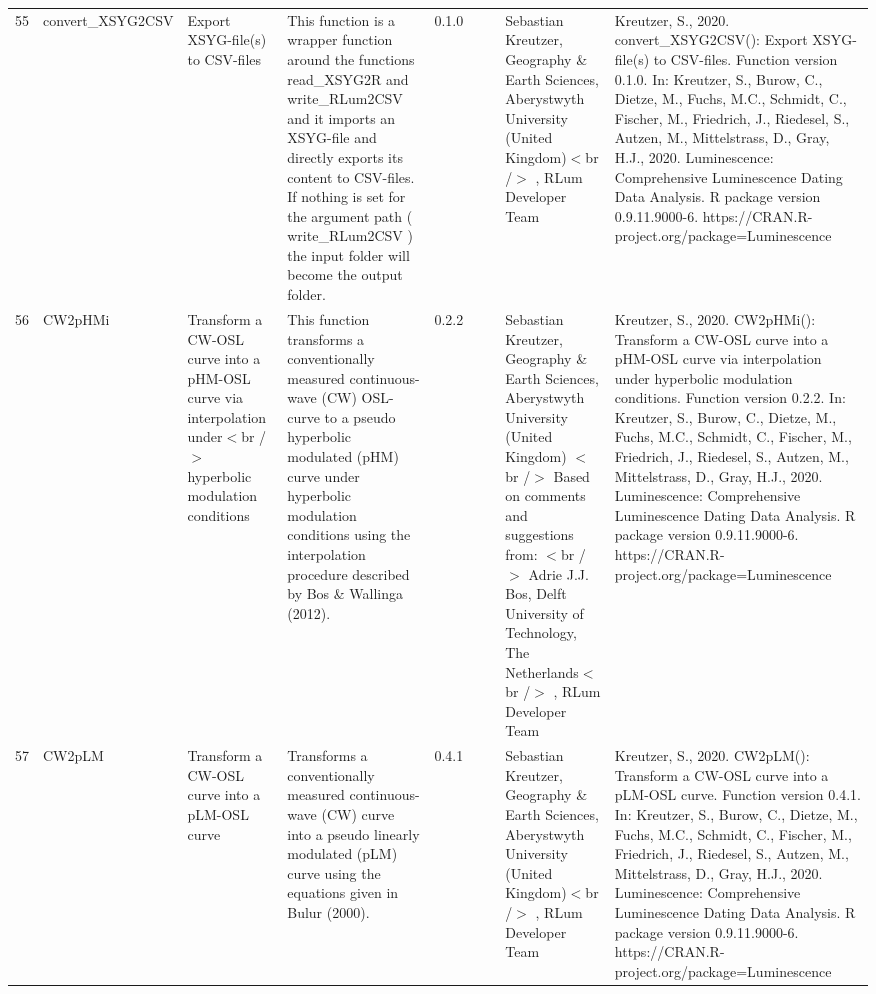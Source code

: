 \begin{table}[ht]
\begin{tabular}{rllllllll}
 \\ 
  55 & convert\_XSYG2CSV & Export XSYG-file(s) to CSV-files & This function is a wrapper function around the functions  read\_XSYG2R  and write\_RLum2CSV  and it imports an XSYG-file and directly exports its content to CSV-files. If nothing is set for the argument  path  ( write\_RLum2CSV ) the input folder will become the output folder. & 0.1.0
 &  &  & Sebastian Kreutzer, Geography \& Earth Sciences, Aberystwyth University (United Kingdom)$<$br /$>$ , RLum Developer Team & Kreutzer, S., 2020. convert\_XSYG2CSV(): Export XSYG-file(s) to CSV-files. Function version 0.1.0. In: Kreutzer, S., Burow, C., Dietze, M., Fuchs, M.C., Schmidt, C., Fischer, M., Friedrich, J., Riedesel, S., Autzen, M., Mittelstrass, D., Gray, H.J., 2020. Luminescence: Comprehensive Luminescence Dating Data Analysis. R package version 0.9.11.9000-6. https://CRAN.R-project.org/package=Luminescence
 \\ 
  56 & CW2pHMi & Transform a CW-OSL curve into a pHM-OSL curve via interpolation under$<$br /$>$ hyperbolic modulation conditions & This function transforms a conventionally measured continuous-wave (CW) OSL-curve to a pseudo hyperbolic modulated (pHM) curve under hyperbolic modulation conditions using the interpolation procedure described by Bos \& Wallinga (2012). & 0.2.2
 &  &  & Sebastian Kreutzer, Geography \& Earth Sciences, Aberystwyth University (United Kingdom) $<$br /$>$ Based on comments and suggestions from: $<$br /$>$ Adrie J.J. Bos, Delft University of Technology, The Netherlands$<$br /$>$ , RLum Developer Team & Kreutzer, S., 2020. CW2pHMi(): Transform a CW-OSL curve into a pHM-OSL curve via interpolation under hyperbolic modulation conditions. Function version 0.2.2. In: Kreutzer, S., Burow, C., Dietze, M., Fuchs, M.C., Schmidt, C., Fischer, M., Friedrich, J., Riedesel, S., Autzen, M., Mittelstrass, D., Gray, H.J., 2020. Luminescence: Comprehensive Luminescence Dating Data Analysis. R package version 0.9.11.9000-6. https://CRAN.R-project.org/package=Luminescence
 \\ 
  57 & CW2pLM & Transform a CW-OSL curve into a pLM-OSL curve & Transforms a conventionally measured continuous-wave (CW) curve into a pseudo linearly modulated (pLM) curve using the equations given in Bulur (2000). & 0.4.1
 &  &  & Sebastian Kreutzer, Geography \& Earth Sciences, Aberystwyth University (United Kingdom)$<$br /$>$ , RLum Developer Team & Kreutzer, S., 2020. CW2pLM(): Transform a CW-OSL curve into a pLM-OSL curve. Function version 0.4.1. In: Kreutzer, S., Burow, C., Dietze, M., Fuchs, M.C., Schmidt, C., Fischer, M., Friedrich, J., Riedesel, S., Autzen, M., Mittelstrass, D., Gray, H.J., 2020. Luminescence: Comprehensive Luminescence Dating Data Analysis. R package version 0.9.11.9000-6. https://CRAN.R-project.org/package=Luminescence

\end{tabular}
\end{table}
